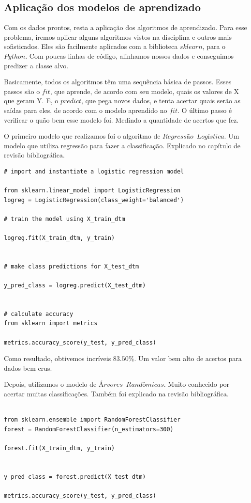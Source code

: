 \documentclass [12pt, a4paper] {article}
\begin{document}
\subsection{Aplicação dos modelos de aprendizado}


Com os dados prontos, resta a aplicação dos algoritmos de aprendizado.
Para esse problema, iremos aplicar alguns algoritmos vistos na disciplina e outros mais sofisticados. Eles são facilmente aplicados com a biblioteca $sklearn$, para o $Python$. Com poucas linhas de código, alinhamos nossos dados e conseguimos predizer a classe alvo.

Basicamente, todos os algoritmos têm uma sequência básica de passos. Esses passos são o $fit$, que aprende, de acordo com seu modelo, quais os valores de X que geram Y. E, o $predict$, que pega novos dados, e tenta acertar quais serão as saídas para eles, de acordo com o modelo aprendido no $fit$. O último passo é verificar o quão bem esse modelo foi. Medindo a quantidade de acertos que fez.

O primeiro modelo que realizamos foi o algoritmo de $Regressão \;\ Logística$. Um modelo que utiliza regressão para fazer a classificação. Explicado no capítulo de revisão bibliográfica.

\begin{lstlisting}
# import and instantiate a logistic regression model

from sklearn.linear_model import LogisticRegression
logreg = LogisticRegression(class_weight='balanced')

# train the model using X_train_dtm

logreg.fit(X_train_dtm, y_train)


# make class predictions for X_test_dtm

y_pred_class = logreg.predict(X_test_dtm)


# calculate accuracy
from sklearn import metrics

metrics.accuracy_score(y_test, y_pred_class)
\end{lstlisting}

Como resultado, obtivemos incríveis $83.50\%$. Um valor bem alto de acertos para dados bem crus.


Depois, utilizamos o modelo de $Árvores \;\ Randômicas$. Muito conhecido por acertar muitas classificações. Também foi explicado na revisão bibliográfica. 

\begin{lstlisting}

from sklearn.ensemble import RandomForestClassifier
forest = RandomForestClassifier(n_estimators=300)

forest.fit(X_train_dtm, y_train)


y_pred_class = forest.predict(X_test_dtm)

metrics.accuracy_score(y_test, y_pred_class)

\end{lstlisting}
\end{document}
